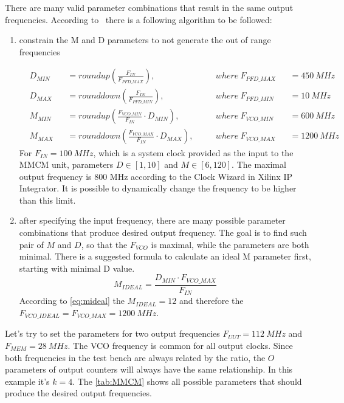 There are many valid parameter combinations that result in the same output frequencies. According to~\cite{manual:MMCM} there is a following algorithm to be followed:
\begin{enumerate}
    \item constrain the M and D parameters to not generate the out of range frequencies 

    \begin{subequations}
        \begin{alignat}{4}
            & D_{MIN} &&=roundup(\frac{F_{IN}}{F_{PFD\_MAX}}),\quad && where \ F_{PFD\_MAX} && =450 \ MHz \label{eq:dmin}\\
            & D_{MAX} &&=rounddown(\frac{F_{IN}}{F_{PFD\_MIN}}),\quad  && where \ F_{PFD\_MIN} && =10 \ MHz \label{eq:dmax}\\
            & M_{MIN} &&=roundup(\frac{F_{VCO\_MIN}}{F_{IN}} \cdot D_{MIN}),\quad && where \ F_{VCO\_MIN} && =600 \ MHz \label{eq:mmin}\\
            & M_{MAX} &&=rounddown(\frac{F_{VCO\_MAX}}{F_{IN}} \cdot D_{MAX}),\quad && where \ F_{VCO\_MAX} && =1200 \ MHz \label{eq:mmax}
        \end{alignat}
    \end{subequations}
For $F_{IN} = 100 \ MHz$, which is a system clock provided as the input to the MMCM unit, parameters $D \in [1,10]$ and $M \in [6,120]$. The maximal output frequency is 800 MHz according to the Clock Wizard in Xilinx IP Integrator. It is possible to dynamically change the frequency to be higher than this limit.
    \item after specifying the input frequency, there are many possible parameter combinations that produce desired output frequency. The goal is to find such pair of $M$ and $D$, so that the $F_{VCO}$ is maximal, while the parameters are both minimal. There is a suggested formula to calculate an ideal M parameter first, starting with minimal D value.
    \begin{equation}
         M_{IDEAL} = \frac{D_{MIN} \cdot F_{VCO\_MAX}}{F_{IN}} \label{eq:mideal}
    \end{equation}
    According to \autoref{eq:mideal} the $ M_{IDEAL} = 12$ and therefore the $F_{VCO\_IDEAL}=F_{VCO\_MAX}=1200 \ MHz$. 
\end{enumerate}
Let's try to set the parameters for two output frequencies $F_{UUT} = 112 \ MHz$ and $F_{MEM} = 28 \ MHz$. The VCO frequency is common for all output clocks. Since both frequencies in the test bench are always related by the ratio, the $O$ parameters of output counters will always have the same relationship. In this example it's $k=4$.
The \autoref{tab:MMCM} shows all possible parameters that should produce the desired output frequencies.

